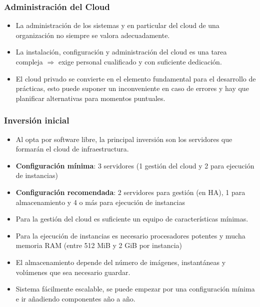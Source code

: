 \documentclass{beamer}
\begin{document}
\begin{frame}
  \frametitle{Administración del Cloud}
  \begin{itemize}
  \item La administración de los sistemas y en particular del cloud de
    una organización no siempre se valora adecuadamente.
  \item La instalación, configuración y administración del cloud es
    una tarea compleja $\Rightarrow$ exige personal cualificado y con
    suficiente dedicación. 
  \item El cloud privado se convierte en el elemento fundamental para
    el desarrollo de prácticas, esto puede suponer un inconveniente en
    caso de errores y hay que planificar alternativas para momentos
    puntuales.
  \end{itemize}
\end{frame}

\begin{frame}
  \frametitle{Inversión inicial}
  \begin{itemize}
  \item Al opta por software libre, la principal inversión son los servidores
    que formarán el cloud de infraestructura.
  \item \textbf{Configuración mínima}: 3 servidores (1 gestión del cloud y 2 para
    ejecución de instancias)
  \item \textbf{Configuración recomendada}: 2 servidores para gestión (en HA), 1
    para almacenamiento y 4 o más para ejecución de instancias
  \item Para la gestión del cloud es suficiente un equipo de características
    mínimas.
  \item Para la ejecución de instancias es necesario procesadores potentes y
    mucha memoria RAM (entre 512 MiB y 2 GiB por instancia) 
  \item El almacenamiento depende del número de imágenes, instantáneas y
    volúmenes que sea necesario guardar.
  \item Sistema fácilmente escalable, se puede empezar por una
    configuración mínima e ir añadiendo componentes año a año.
  \end{itemize}
\end{frame}
\end{document}
